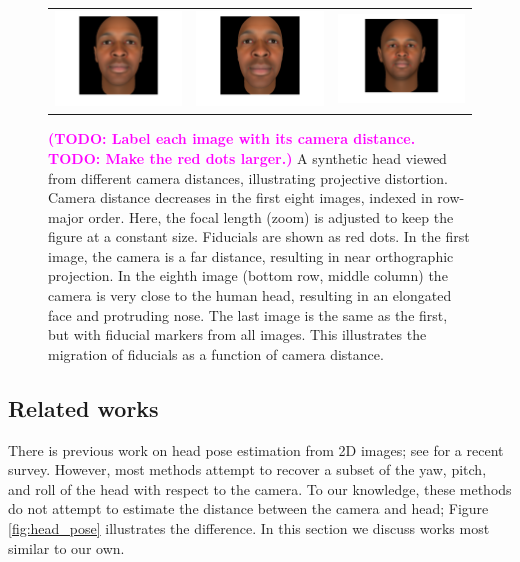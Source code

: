 \documentclass[runningheads]{llncs}
\newcommand {\ericnote} [1] {{\bf \textcolor{magenta}{(#1)}}}
\begin{document}
\begin{figure}[ht!]
\begin{tabular}{ccc}
\includegraphics[width=.33\linewidth]{resources/figures/extracted_fiducial_0005.png} &
\includegraphics[width=.33\linewidth]{resources/figures/extracted_fiducial_0007.png} &
\includegraphics[width=.33\linewidth]{resources/figures/fiducial_migration.png}
\end{tabular}
\caption{
\ericnote{TODO: Label each image with its camera distance. TODO: Make the red dots larger.}
A synthetic head viewed from different camera distances, illustrating projective distortion.
Camera distance decreases in the first eight images, indexed in row-major order.
Here, the focal length (zoom) is adjusted to keep the figure at a constant size.
Fiducials are shown as red dots.
In the first image, the camera is a far distance, resulting in near orthographic projection.
In the eighth image (bottom row, middle column) the camera is very close to the human head, resulting in an elongated face and protruding nose.  
The last image is the same as the first, but with fiducial markers from all images.
This illustrates the migration of fiducials as a function of camera distance. 
} 
\label{fig:fiducial_migration}
\end{figure}

\subsection{Related works} \label{sec:related}
There is previous work on head pose estimation from 2D images; see \cite{murphy2009head} for a recent survey.
However, most methods attempt to recover a subset of the yaw, pitch, and roll of the head with respect to the camera.
To our knowledge, these methods do not attempt to estimate the distance between the camera and head; Figure \ref{fig:head_pose} illustrates the difference.
In this section we discuss works most similar to our own.
\end{document}
